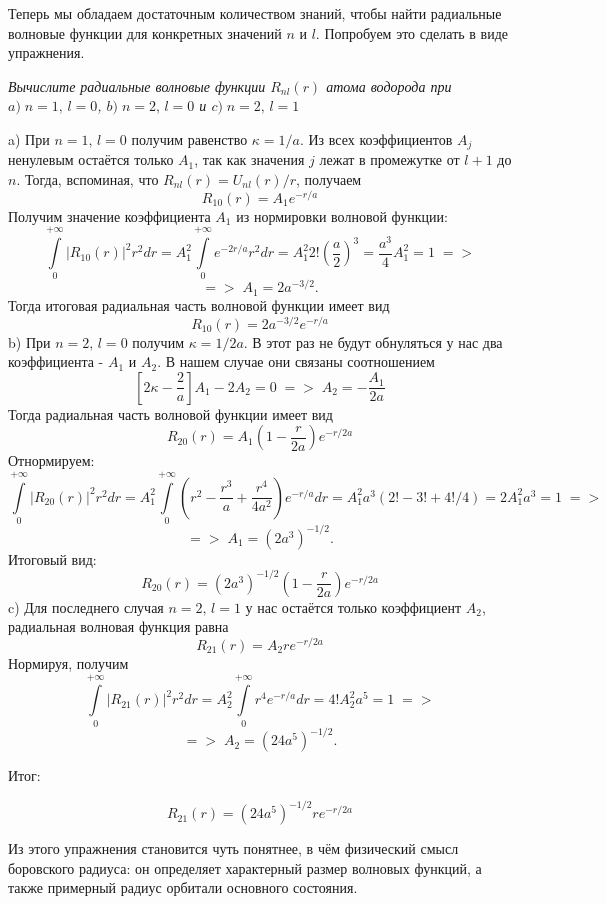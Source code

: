 Теперь мы обладаем достаточным количеством знаний, чтобы найти радиальные волновые функции для конкретных значений $n$ и $l$. Попробуем это сделать в виде упражнения.
\newpage
{}
\begin{center}
    \textit{Вычислите радиальные волновые функции $R_{nl}(r)$ атома водорода при $ a)\;n = 1,\, l =0$, $b)\;n = 2,\, l =0$ и $c)\;n = 2,\, l =1$}
\end{center}
a)  При $n = 1,\, l=0$ получим равенство $\kappa = 1/a$. Из всех коэффициентов $A_j$ ненулевым остаётся только $A_1$, так как значения $j$ лежат в промежутке от $l+1$ до $n$. Тогда, вспоминая, что $R_{nl}(r) = U_{nl}(r)/r$, получаем
\[
R_{10}(r) = A_1e^{-r/a}
\]
Получим значение коэффициента $A_1$ из нормировки волновой функции:
\[
\int\limits_0^{+\infty}|R_{10}(r)|^2 r^2 dr = A^2_1\int\limits_0^{+\infty}e^{-2r/a}r^2 dr = A^2_1 2!(\frac{a}{2})^3 = \frac{a^3}{4}A^2_1 = 1\;=>
\]
\[
=>\; A_1 = 2a^{-3/2}.
\]
Тогда итоговая радиальная часть волновой функции имеет вид
\[
R_{10}(r) = 2a^{-3/2}e^{-r/a}
\]
b) При $n = 2,\, l=0$ получим $\kappa = 1/2a$. В этот раз не будут обнуляться у нас два коэффициента - $A_1$ и $A_2$. В нашем случае они связаны соотношением
\[
\left[ 2\kappa - \frac{2}{a} \right]A_1 - 2A_2 = 0\; =>\; A_2 = -\frac{A_1}{2a}
\]
Тогда радиальная часть волновой функции имеет вид
\[
R_{20}(r) = A_1\left( 1 - \frac{r}{2a} \right) e^{-r/2a}
\]
Отнормируем:
\[
\int\limits_0^{+\infty}|R_{20}(r)|^2 r^2 dr = A^2_1\int\limits_0^{+\infty}\left( r^2 - \frac{r^3}{a} +\frac{r^4}{4a^2} \right)e^{-r/a} dr = A^2_1 a^3 (2! - 3! + 4!/4) = 2A^2_1 a^3 = 1\;=>
\]
\[
=>\; A_1 = (2a^3)^{-1/2}.
\]
Итоговый вид:
\[
R_{20}(r) = (2a^3)^{-1/2}\left( 1 - \frac{r}{2a} \right) e^{-r/2a}
\]
c) Для последнего случая $n=2,\, l=1$ у нас остаётся только коэффициент $A_2$, радиальная волновая функция равна
\[
R_{21}(r) = A_2re^{-r/2a}
\]
Нормируя, получим
\[
\int\limits_0^{+\infty}|R_{21}(r)|^2 r^2 dr = A^2_2\int\limits_0^{+\infty}r^4 e^{-r/a} dr = 4! A^2_2 a^5 = 1\;=>
\]
\[
=>\; A_2 = (24a^5)^{-1/2}.
\]

Итог:

\[
R_{21}(r) = (24a^5)^{-1/2}re^{-r/2a}
\]

Из этого упражнения становится чуть понятнее, в чём физический смысл боровского радиуса: он определяет характерный размер волновых функций, а также примерный радиус орбитали основного состояния.

